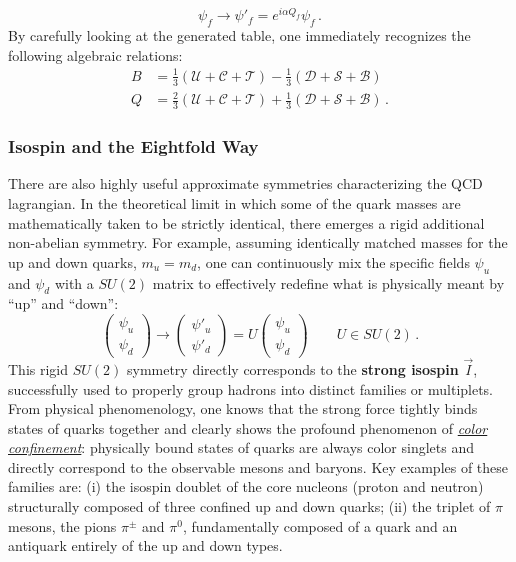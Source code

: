 \begin{equation} \label{eq:electric_transform}
    \psi_f \rightarrow \psi'_f = e^{i\alpha Q_f} \psi_f \, .
\end{equation}
By carefully looking at the generated table, one immediately recognizes the following algebraic relations:
\begin{equation} \label{eq:charge_relations}
    \begin{aligned}
        B & = \frac{1}{3}(\mathcal{U} + \mathcal{C} + \mathcal{T}) - \frac{1}{3}(\mathcal{D} + \mathcal{S} + \mathcal{B})      \\
        Q & = \frac{2}{3}(\mathcal{U} + \mathcal{C} + \mathcal{T}) + \frac{1}{3}(\mathcal{D} + \mathcal{S} + \mathcal{B}) \, .
    \end{aligned}
\end{equation}

\subsubsection{Isospin and the Eightfold Way}

There are also highly useful approximate symmetries characterizing the QCD lagrangian. In the theoretical limit in which some of the quark masses are mathematically taken to be strictly identical, there emerges a rigid additional non-abelian symmetry. For example, assuming identically matched masses for the up and down quarks, \(m_u = m_d\), one can continuously mix the specific fields \(\psi_u\) and \(\psi_d\) with a \(SU(2)\) matrix to effectively redefine what is physically meant by ``up'' and ``down'':
\begin{equation} \label{eq:isospin_su2}
    \begin{pmatrix} \psi_u \\ \psi_d \end{pmatrix} \rightarrow \begin{pmatrix} \psi'_u \\ \psi'_d \end{pmatrix} = U \begin{pmatrix} \psi_u \\ \psi_d \end{pmatrix} \qquad U \in SU(2) \, .
\end{equation}
This rigid \(SU(2)\) symmetry directly corresponds to the \textbf{strong isospin} \(\vec{I}\), successfully used to properly group hadrons into distinct families or multiplets. From physical phenomenology, one knows that the strong force tightly binds states of quarks together and clearly shows the profound phenomenon of \uline{\textit{color confinement}}: physically bound states of quarks are always color singlets and directly correspond to the observable mesons and baryons. Key examples of these families are: (i) the isospin doublet of the core nucleons (proton and neutron) structurally composed of three confined up and down quarks; (ii) the triplet of \(\pi\) mesons, the pions \(\pi^\pm\) and \(\pi^0\), fundamentally composed of a quark and an antiquark entirely of the up and down types.

